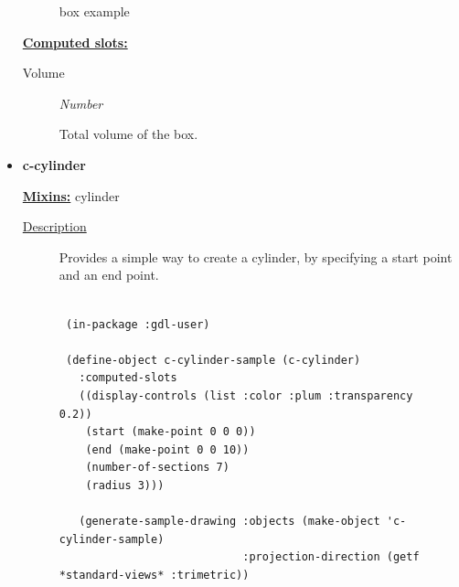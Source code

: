 \documentclass [11pt]{book}
\begin{document}
\begin{itemize}
\begin{figure}
\caption{box example}

\label{fig:box}

\end{figure}





\textbf{
\underline{Computed slots:}}

\begin{description}

\item [Volume]
\emph{Number}

 Total volume of the box.




\end{description}







\item {}
\label{prim:c-cylinder}
\textbf{c-cylinder}


\textbf{
\underline{Mixins:}} cylinder





\begin{description}

\item [
\underline{Description}]


Provides a simple way to create a cylinder, by specifying a start point and an end point.



\end{description}




\begin{figure}
\begin{lrbox}{\boxedverb}
\begin{minipage}{\linewidth}
{\small

\begin{verbatim}

 (in-package :gdl-user)

 (define-object c-cylinder-sample (c-cylinder)
   :computed-slots
   ((display-controls (list :color :plum :transparency 0.2))
    (start (make-point 0 0 0))
    (end (make-point 0 0 10))
    (number-of-sections 7)
    (radius 3)))

   (generate-sample-drawing :objects (make-object 'c-cylinder-sample)
                            :projection-direction (getf *standard-views* :trimetric))
   



\end{verbatim}}
\end{minipage}
\end{lrbox}
\end{figure}
\end{itemize}
\end{document}
